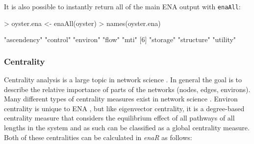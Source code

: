 \documentclass[article]{jss}
\begin{document}
It is also possible to instantly return all of the main ENA output
with \texttt{enaAll}:

\begin{Schunk}
\begin{Sinput}
> oyster.ena <- enaAll(oyster)
> names(oyster.ena)
\end{Sinput}
\begin{Soutput}
[1] "ascendency" "control"    "environ"    "flow"       "mti"       
[6] "storage"    "structure"  "utility"   
\end{Soutput}
\end{Schunk}

\subsubsection{Centrality}
Centrality analysis is a large topic in network science
\citep{brandes05, wasserman1994}.  In general the goal is to describe the
relative importance of parts of the networks (nodes, edges,
environs). Many different types of centrality measures exist in
network science \citep{freeman79, freeman1991centrality, borgatti06,
  brandes05}.  Environ centrality is unique to ENA
\citep{fann12_ec}, but like eigenvector centrality, it is a degree-based
centrality measure that considers the equilibrium effect of all
pathways of all lengths in the system and as such can be classified as
a global centrality measure.   Both of these
centralities can be calculated in \textit{enaR} as follows:

\begin{Schunk}
\end{Schunk}
\end{document}
